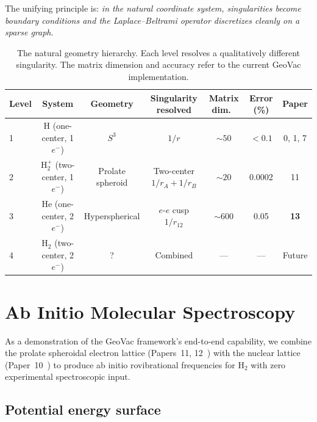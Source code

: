 \documentclass[aps,pra,twocolumn,superscriptaddress,longbibliography]{revtex4-2}
\begin{document}
The unifying principle is: \emph{in the natural coordinate system,
singularities become boundary conditions and the Laplace--Beltrami
operator discretizes cleanly on a sparse graph}.

\begin{table}[t]
\caption{The natural geometry hierarchy.  Each level resolves a
qualitatively different singularity.  The matrix dimension and
accuracy refer to the current GeoVac implementation.}
\label{tab:hierarchy}
\begin{ruledtabular}
\begin{tabular}{lcccccc}
  Level & System & Geometry & Singularity resolved & Matrix dim.\
  & Error (\%) & Paper \\
  \hline
  1 & H (one-center, 1$e^-$) & $S^3$ & $1/r$ &
    $\sim\!50$ & $< 0.1$ & 0, 1, 7 \\
  2 & H$_2^+$ (two-center, 1$e^-$) & Prolate spheroid & Two-center
    $1/r_A + 1/r_B$ & $\sim\!20$ & 0.0002 & 11 \\
  3 & He (one-center, 2$e^-$) & Hyperspherical & $e$-$e$ cusp
    $1/r_{12}$ & $\sim\!600$ & 0.05 & \textbf{13} \\
  4 & H$_2$ (two-center, 2$e^-$) & ? & Combined &
    --- & --- & Future \\
\end{tabular}
\end{ruledtabular}
\end{table}


\section{Ab Initio Molecular Spectroscopy}
\label{sec:spectroscopy}

As a demonstration of the GeoVac framework's end-to-end capability,
we combine the prolate spheroidal electron lattice (Papers~11,
12~\cite{loutey_paper11, loutey_paper12}) with the nuclear lattice
(Paper~10~\cite{loutey_paper10}) to produce ab initio rovibrational
frequencies for H$_2$ with zero experimental spectroscopic input.

\subsection{Potential energy surface}
\end{document}
